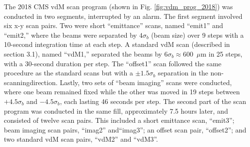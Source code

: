 The 2018 CMS vdM scan program (shown in Fig. \ref{fig:vdm_prog_2018}) was conducted in two segments, interrupted by an alarm. The first segment involved six x-y scan pairs. Two were short ``emittance'' scans, named ``emit1'' and ``emit2,'' where the beams were separated by \(4\sigma_b\) (beam size) over 9 steps with a 10-second integration time at each step. A standard vdM scan (described in section 3.1), named ``vdM1,'' separated the beams by \(6\sigma_b \approx 600\)~$\mu$m in 25 steps, with a 30-second duration per step. The ``offset1'' scan followed the same procedure as the standard scans but with a \(\pm 1.5\sigma_b\) separation in the non-scanningdirection. Lastly, two sets of ``beam imaging'' scans were conducted, where one beam remained fixed while the other was moved in 19 steps between \(+4.5\sigma_b\) and \(-4.5\sigma_b\), each lasting 46 seconds per step. The second part of the scan program was conducted in the same fill, approximately 7.5 hours later, and consisted of twelve scan pairs. This included a short emittance scan, ``emit3''; beam imaging scan pairs, ``imag2'' and``imag3''; an offset scan pair, ``offset2''; and two standard vdM scan pairs, ``vdM2'' and ``vdM3''.

